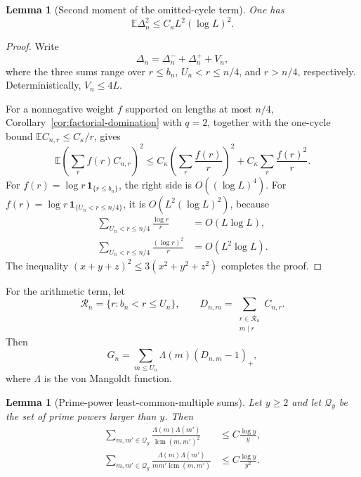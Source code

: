 \documentclass[11pt]{article}
\newtheorem{lemma}[theorem]{Lemma}
\theoremstyle{remark}
\newcommand{\Ee}{\mathbb E}
\newcommand{\one}{\mathbf 1}
\newcommand{\lcm}{\operatorname{lcm}}
\begin{document}
\begin{lemma}[Second moment of the omitted-cycle term]
\label{lem:Delta-second}
One has
\begin{equation}
\label{eq:Delta-second}
 \Ee\Delta_n^2\le C_\kappa L^2(\log L)^2.
\end{equation}
\end{lemma}

\begin{proof}
Write
\[
 \Delta_n=\Delta_n^-+\Delta_n^++V_n,
\]
where the three sums range over $r\le b_n$,
$U_n<r\le n/4$, and $r>n/4$, respectively.  Deterministically,
$V_n\le4L$.

For a nonnegative weight $f$ supported on lengths at most $n/4$,
Corollary~\ref{cor:factorial-domination} with $q=2$, together with the
one-cycle bound $\Ee C_{n,r}\le C_\kappa/r$, gives
\begin{equation}
\label{eq:linear-second}
 \Ee\left(\sum_rf(r)C_{n,r}\right)^2
 \le C_\kappa\left(\sum_r\frac{f(r)}r\right)^2
   +C_\kappa\sum_r\frac{f(r)^2}r.
\end{equation}
For $f(r)=\log r\,\one_{\{r\le b_n\}}$, the right side is
$O((\log L)^4)$.  For
$f(r)=\log r\,\one_{\{U_n<r\le n/4\}}$, it is
$O(L^2(\log L)^2)$, because
\begin{align*}
 \sum_{U_n<r\le n/4}\frac{\log r}{r}&=O(L\log L),\\
 \sum_{U_n<r\le n/4}\frac{(\log r)^2}{r}&=O(L^2\log L).
\end{align*}
The inequality $(x+y+z)^2\le3(x^2+y^2+z^2)$ completes the proof.
\end{proof}

For the arithmetic term, let
\[
 \mathcal R_n=\{r:b_n<r\le U_n\},
 \qquad
 D_{n,m}=\sum_{\substack{r\in\mathcal R_n\\m\mid r}}C_{n,r}.
\]
Then
\begin{equation}
\label{eq:G-vonmangoldt}
 G_n=\sum_{m\le U_n}\Lambda(m)(D_{n,m}-1)_+,
\end{equation}
where $\Lambda$ is the von Mangoldt function.

\begin{lemma}[Prime-power least-common-multiple sums]
\label{lem:lcm-sums}
Let $y\ge2$ and let $\mathcal Q_y$ be the set of prime powers larger than
$y$.  Then
\begin{align}
 \sum_{m,m'\in\mathcal Q_y}
 \frac{\Lambda(m)\Lambda(m')}{\lcm(m,m')^2}
 &\le C\frac{\log y}{y},
 \label{eq:lcm-square-sum}\\
 \sum_{m,m'\in\mathcal Q_y}
 \frac{\Lambda(m)\Lambda(m')}{mm'\lcm(m,m')}
 &\le C\frac{\log y}{y^2}.
 \label{eq:lcm-cubic-sum}
\end{align}
\end{lemma}
\end{document}
